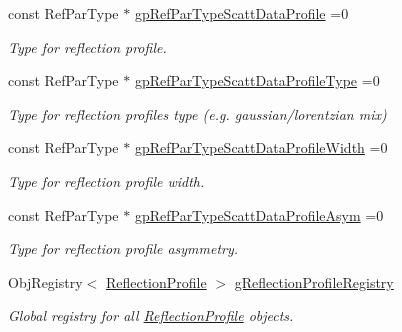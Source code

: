 \begin{DoxyCompactItemize}
\mbox{\label{namespace_obj_cryst_a670424a3000db620466160c5900af055}} 
const Ref\+Par\+Type $\ast$ \mbox{\hyperlink{namespace_obj_cryst_a670424a3000db620466160c5900af055}{gp\+Ref\+Par\+Type\+Scatt\+Data\+Profile}} =0
\begin{DoxyCompactList}\small\item\em Type for reflection profile. \end{DoxyCompactList}\item 
\mbox{\label{namespace_obj_cryst_a8bd1f8b00a940dc466c8d75a6afd0ff0}} 
const Ref\+Par\+Type $\ast$ \mbox{\hyperlink{namespace_obj_cryst_a8bd1f8b00a940dc466c8d75a6afd0ff0}{gp\+Ref\+Par\+Type\+Scatt\+Data\+Profile\+Type}} =0
\begin{DoxyCompactList}\small\item\em Type for reflection profiles type (e.\+g. gaussian/lorentzian mix) \end{DoxyCompactList}\item 
\mbox{\label{namespace_obj_cryst_a27239cd7a10f88879e3f6947e975eab3}} 
const Ref\+Par\+Type $\ast$ \mbox{\hyperlink{namespace_obj_cryst_a27239cd7a10f88879e3f6947e975eab3}{gp\+Ref\+Par\+Type\+Scatt\+Data\+Profile\+Width}} =0
\begin{DoxyCompactList}\small\item\em Type for reflection profile width. \end{DoxyCompactList}\item 
\mbox{\label{namespace_obj_cryst_ad52d9d88f4ff9de9404dc453414f9686}} 
const Ref\+Par\+Type $\ast$ \mbox{\hyperlink{namespace_obj_cryst_ad52d9d88f4ff9de9404dc453414f9686}{gp\+Ref\+Par\+Type\+Scatt\+Data\+Profile\+Asym}} =0
\begin{DoxyCompactList}\small\item\em Type for reflection profile asymmetry. \end{DoxyCompactList}\item 
\mbox{\label{namespace_obj_cryst_aa3d65d7163c076e698eb0f3eaeeef8b4}} 
Obj\+Registry$<$ \mbox{\hyperlink{class_obj_cryst_1_1_reflection_profile}{Reflection\+Profile}} $>$ \mbox{\hyperlink{namespace_obj_cryst_aa3d65d7163c076e698eb0f3eaeeef8b4}{g\+Reflection\+Profile\+Registry}}
\begin{DoxyCompactList}\small\item\em Global registry for all \mbox{\hyperlink{class_obj_cryst_1_1_reflection_profile}{Reflection\+Profile}} objects. \end{DoxyCompactList}\item 

\end{DoxyCompactItemize}
